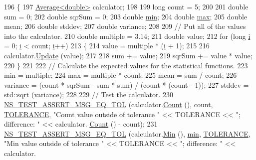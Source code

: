 \begin{DoxyCode}
196 \{
197   \hyperlink{classns3_1_1Average}{Average<double>} calculator;
198 
199   \textcolor{keywordtype}{long} count = 5;
200 
201   \textcolor{keywordtype}{double} sum = 0;
202   \textcolor{keywordtype}{double} sqrSum = 0;
203   \textcolor{keywordtype}{double} \hyperlink{80211b_8c_ac6afabdc09a49a433ee19d8a9486056d}{min};
204   \textcolor{keywordtype}{double} \hyperlink{80211b_8c_affe776513b24d84b39af8ab0930fef7f}{max};
205   \textcolor{keywordtype}{double} mean;
206   \textcolor{keywordtype}{double} stddev;
207   \textcolor{keywordtype}{double} variance;
208 
209   \textcolor{comment}{// Put all of the values into the calculator.}
210   \textcolor{keywordtype}{double} multiple = 3.14;
211   \textcolor{keywordtype}{double} value;
212   \textcolor{keywordflow}{for} (\textcolor{keywordtype}{long} \hyperlink{bernuolliDistribution_8m_a6f6ccfcf58b31cb6412107d9d5281426}{i} = 0; \hyperlink{bernuolliDistribution_8m_a6f6ccfcf58b31cb6412107d9d5281426}{i} < count; \hyperlink{bernuolliDistribution_8m_a6f6ccfcf58b31cb6412107d9d5281426}{i}++)
213     \{
214       value = multiple * (\hyperlink{bernuolliDistribution_8m_a6f6ccfcf58b31cb6412107d9d5281426}{i} + 1);
215 
216       calculator.\hyperlink{classns3_1_1Average_a223cb5172985f2cf4944488f4ac1186b}{Update} (value);
217 
218       sum    += value;
219       sqrSum += value * value;
220     \}
221 
222   \textcolor{comment}{// Calculate the expected values for the statistical functions.}
223   min = multiple;
224   max = multiple * count;
225   mean = sum / count;
226   variance = (count * sqrSum - sum * sum) / (count * (count - 1));
227   stddev = std::sqrt (variance);
228 
229   \textcolor{comment}{// Test the calculator.}
230   \hyperlink{group__testing_ga9e7861b56b4e70db3b56044cb7a28e41}{NS\_TEST\_ASSERT\_MSG\_EQ\_TOL} (calculator.\hyperlink{classns3_1_1Average_abdf7954e5cba2818febdd0588b8e4a20}{Count} (), count, 
      \hyperlink{average-test-suite_8cc_a89311a98397f9d6967d2cb10d5152d77}{TOLERANCE}, \textcolor{stringliteral}{"Count value outside of tolerance "} << TOLERANCE << \textcolor{stringliteral}{"; difference: "} << calculator.
      \hyperlink{classns3_1_1Average_abdf7954e5cba2818febdd0588b8e4a20}{Count} () - count);
231   \hyperlink{group__testing_ga9e7861b56b4e70db3b56044cb7a28e41}{NS\_TEST\_ASSERT\_MSG\_EQ\_TOL} (calculator.\hyperlink{classns3_1_1Average_a4649e7990b939fc55360312ac4ab6828}{Min} (), \hyperlink{80211b_8c_ac6afabdc09a49a433ee19d8a9486056d}{min}, 
      \hyperlink{average-test-suite_8cc_a89311a98397f9d6967d2cb10d5152d77}{TOLERANCE}, \textcolor{stringliteral}{"Min value outside of tolerance "} << TOLERANCE << \textcolor{stringliteral}{"; difference: "} << calculator.

\end{DoxyCode}
